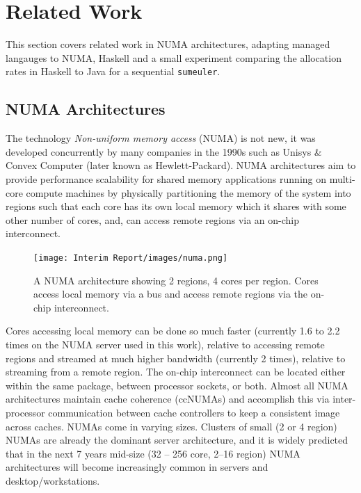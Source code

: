 \documentclass{paper}\usepackage{graphicx}
\begin{document}
\section{Related Work}
\label{sec:background}

This section covers related work in NUMA architectures, adapting managed langauges to NUMA, Haskell and a small experiment comparing the allocation rates in Haskell to Java for a sequential \lstinline{sumeuler}.

\subsection{NUMA Architectures}
\label{sec:numa_architectures}

The technology \textit{Non-uniform memory access} (NUMA) is not new, it was developed concurrently by many companies in the 1990s such as Unisys \& Convex Computer (later known as Hewlett-Packard). NUMA architectures aim to provide performance scalability for shared memory applications running on multi-core compute machines by physically partitioning the memory of the system into regions such that each core has its own local memory which it shares with some other number of cores, and, can access remote regions via an on-chip interconnect\cite{DBLP:journals/tpds/LaRoweEH92}. 

\begin{figure}[!htb]
    \centering
    \texttt{[image: Interim Report/images/numa.png]}
    \caption{A NUMA architecture showing 2 regions, 4 cores per region. Cores access local memory via a bus and access remote regions via the on-chip interconnect.}
    \label{fig:my_label}
\end{figure}

Cores accessing local memory can be done so much faster (currently 1.6 to 2.2 times on the NUMA server used in this work), relative to accessing remote regions and streamed at much higher bandwidth (currently 2 times), relative to streaming from a remote region. The on-chip interconnect can be located either within the same package, between processor sockets, or both. Almost all NUMA architectures maintain cache coherence (ccNUMAs) and accomplish this via inter-processor communication between cache controllers to keep a consistent image across caches. NUMAs come in varying sizes. Clusters of small (2 or 4 region) NUMAs are already the dominant server architecture, and it is widely predicted that in the next 7 years mid-size (32 – 256 core, 2–16 region) NUMA architectures will become increasingly common in
servers and desktop/workstations.
\end{document}
